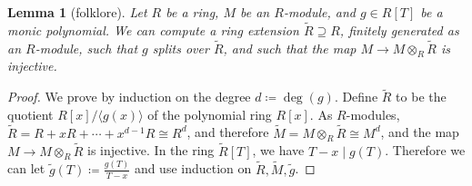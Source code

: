 \documentclass[letterpaper, 11pt, thm-restate]{article}
\numberwithin{equation}{section}
\newtheorem{lemma}[theorem]{Lemma}
\theoremstyle{definition}
\theoremstyle{definition}
\theoremstyle{definition}
\begin{document}
\begin{lemma}[folklore]\label{lem:split_extension}
    Let $R$ be a ring, $M$ be an $R$-module, and $g \in R[T]$ be a monic polynomial. We can compute a ring extension $\widetilde R \supseteq R$, finitely generated as an $R$-module, such that $g$ splits over $\widetilde R$, and such that the map $M\rightarrow M\otimes _R \widetilde R$ is injective. 
\end{lemma}
\begin{proof}
    We prove by induction on the degree $d \coloneqq \deg(g)$. 
    Define $\widetilde R$ to be the quotient $R[x]/\langle g(x)\rangle$ of the polynomial ring $R[x]$. 
    As $R$-modules, $\widetilde R = R + xR + \cdots + x^{d-1}R \cong R^d$, and therefore $\widetilde M =M\otimes_R \widetilde R \cong M^d$, and the map $M\rightarrow M\otimes _R \widetilde R$ is injective. 
    In the ring $\widetilde R[T]$, we have $T - x \mid g(T)$.
    Therefore we can let $\widetilde g(T) \coloneqq \frac{g(T)}{T-x}$ and use induction on $\widetilde R, \widetilde M, \widetilde g$. 
\end{proof}
\end{document}
